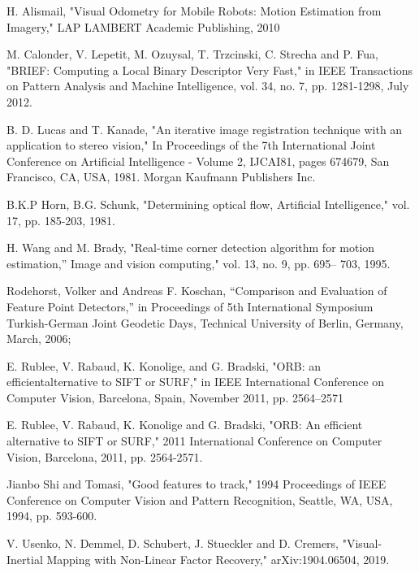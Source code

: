 \documentclass{easychair}
\begin{document}
\begin{thebibliography}{00}
	
	 H. Alismail, "Visual Odometry for Mobile Robots: Motion Estimation from Imagery," LAP LAMBERT Academic Publishing, 2010 
 	
	M. Calonder, V. Lepetit, M. Ozuysal, T. Trzcinski, C. Strecha and P. Fua, "BRIEF: Computing a Local Binary Descriptor Very Fast," in IEEE Transactions on Pattern Analysis and Machine Intelligence, vol. 34, no. 7, pp. 1281-1298, July 2012.
	
	 B. D. Lucas and T. Kanade, "An iterative image registration technique
	with an application to stereo vision," In Proceedings of the 7th International
	Joint Conference on Artificial Intelligence - Volume 2, IJCAI81,
	pages 674679, San Francisco, CA, USA, 1981. Morgan Kaufmann
	Publishers Inc.
	
	 B.K.P Horn, B.G. Schunk, "Determining optical flow, Artificial Intelligence,"
	vol. 17, pp. 185-203, 1981.
	
	
	 H. Wang and M. Brady, "Real-time corner detection algorithm for
	motion estimation,” Image and vision computing," vol. 13, no. 9, pp. 695–
	703, 1995.
	
	 Rodehorst, Volker and Andreas F. Koschan, “Comparison and Evaluation of Feature Point Detectors,” in Proceedings
	of 5th International Symposium Turkish-German Joint Geodetic Days, Technical University of
	Berlin, Germany, March, 2006; 
		
	 E. Rublee, V. Rabaud, K. Konolige, and G. Bradski, "ORB: an efficientalternative  to  SIFT  or  SURF,"  in IEEE  International  Conference  on Computer Vision, Barcelona, Spain, November 2011, pp. 2564–2571
	
	 E. Rublee, V. Rabaud, K. Konolige and G. Bradski, "ORB: An efficient alternative to SIFT or SURF," 2011 International Conference on Computer Vision, Barcelona, 2011, pp. 2564-2571.
	
	 Jianbo Shi and Tomasi, "Good features to track," 1994 Proceedings of IEEE Conference on Computer Vision and Pattern Recognition, Seattle, WA, USA, 1994, pp. 593-600.

	 V. Usenko, N. Demmel, D. Schubert, J. Stueckler and D. Cremers, "Visual-Inertial Mapping with Non-Linear Factor Recovery," arXiv:1904.06504, 2019.

	
	
	
\end{thebibliography}
\end{document}
